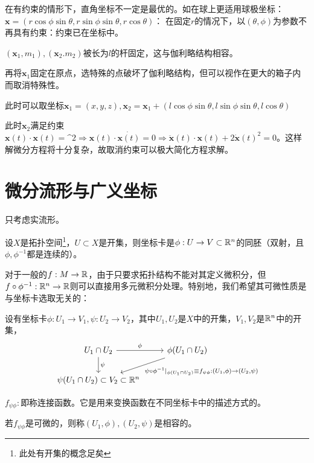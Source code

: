 \documentclass{ctexbook}
\begin{document}
在有约束的情形下，直角坐标不一定是最优的。如在球上更适用球极坐标：$\bm x=(r\cos\phi\sin\theta,r\sin\phi\sin\theta,r\cos\theta)$：
在固定$r$的情况下，以$(\theta,\phi)$为参数不再具有约束：约束已在坐标中。


\begin{Eg}
  $(\bm x_{1},m_{1}),(\bm x_{2}.m_{2})$被长为$l$的杆固定，这与伽利略结构相容。

  再将$\bm x_{1}$固定在原点，选特殊的点破坏了伽利略结构，但可以视作在更大的箱子内而取消特殊性。

  此时可以取坐标$\bm x_{1}=(x,y,z), \bm x_{2}=\bm x_{1}+(l\cos\phi\sin\theta,l\sin\phi\sin\theta,l\cos\theta)$

  此时$\bm x_{2}$满足约束$\bm x(t)\cdot\bm x(t)=\^{2}\Rightarrow \bm x(t)\cdot \dot{\bm x(t)}=0\Rightarrow \ddot{\bm x}(t)\cdot \bm x(t)+2\dot{\bm x}(t)^{2}=0$。这样解微分方程将十分复杂，故取消约束可以极大简化方程求解。
\end{Eg}

\section{微分流形与广义坐标}
只考虑实流形。
\begin{Def}
  设$X$是拓扑空间\footnote{此处有开集的概念足矣}，$U\subset X$是开集，则坐标卡是$\phi:U\to V\subset \mathbb{R}^{n}$的同胚（双射，且$\phi,\phi^{-1}$都是连续的）。
\end{Def}

对于一般的$f:M\to\mathbb{R}$，由于只要求拓扑结构不能对其定义微积分，但$f\circ \phi^{-1}:\mathbb{R}^{n}\to \mathbb{R}$则可以直接用多元微积分处理。特别地，我们希望其可微性质是与坐标卡选取无关的：

\begin{Def}[连接函数]
  设有坐标卡$\phi:U_{1}\to V_{1},\psi:U_{2}\to V_{2}$，其中$U_{1},U_{2}$是$X$中的开集，$V_{1},V_{2}$是$\mathbb{R}^{n}$中的开集，
  \[\begin{tikzcd}
U_1\cap U_2 \arrow[d, "\psi"] \arrow[r, "\phi"]  & \phi(U_1\cap U_2) \arrow[ld, "{\psi\circ \phi^{-1}|_{\phi(U_{1}\cap U_{2})}\equiv f_{\psi\phi}:(U_1,\phi)\to (U_2,\psi)}"] \\
\psi(U_1\cap U_2)\subset V_2\subset \mathbb{R}^n &                                              \end{tikzcd}  \]

$f_{\psi\phi}:$即称连接函数。它是用来变换函数在不同坐标卡中的描述方式的。

若$f_{\psi\phi}$是可微的，则称$(U_{1},\phi),(U_{2},\psi)$是相容的。
\end{Def}
\end{document}
